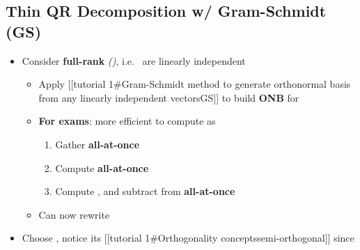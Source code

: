 \subsection*{Thin QR Decomposition w/ Gram-Schmidt
  (GS)}

\begin{itemize}

  \item
        Consider \textbf{full-rank}
        \emph{()},
        i.e.~
        are linearly independent

        \begin{itemize}

          \item
                Apply {[}{[}tutorial 1\#Gram-Schmidt method to generate orthonormal
                basis from any linearly independent vectors\textbar GS{]}{]}
                to build \textbf{ONB}
                for 
          \item
                \textbf{For exams}: more efficient to compute as

                \begin{enumerate}
                  \def\labelenumi{\arabic{enumi})}

                  \item
                        Gather
                        \textbf{all-at-once}
                  \item
                        Compute
                        \textbf{all-at-once}
                  \item
                        Compute , and
                        subtract from  \textbf{all-at-once}
                \end{enumerate}
          \item
                Can now rewrite
        \end{itemize}
  \item
        Choose
        ,
        notice its {[}{[}tutorial 1\#Orthogonality
        concepts\textbar semi-orthogonal{]}{]} since


\end{itemize}

